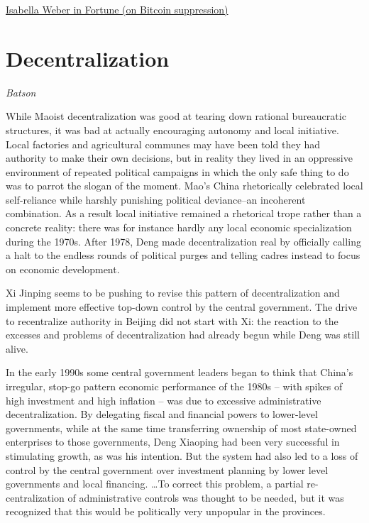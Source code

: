 \documentclass[
]{book}
\begin{document}
\href{https://fortune.com/2021/05/21/china-ban-bitcoin-price-bubble-crypto/}{Isabella Weber in Fortune (on Bitcoin suppression)}

\hypertarget{decentralization}{%
\section{Decentralization}\label{decentralization}}

\emph{Batson}

While Maoist decentralization was good at tearing down rational bureaucratic structures, it was bad at actually encouraging autonomy and local initiative. Local factories and agricultural communes may have been told they had authority to make their own decisions, but in reality they lived in an oppressive environment of repeated political campaigns in which the only safe thing to do was to parrot the slogan of the moment. Mao's China rhetorically celebrated local self-reliance while harshly punishing political deviance--an incoherent combination. As a result local initiative remained a rhetorical trope rather than a concrete reality: there was for instance hardly any local economic specialization during the 1970s. After 1978, Deng made decentralization real by officially calling a halt to the endless rounds of political purges and telling cadres instead to focus on economic development.

Xi Jinping seems to be pushing to revise this pattern of decentralization and implement more effective top-down control by the central government.
The drive to recentralize authority in Beijing did not start with Xi: the reaction to the excesses and problems of decentralization had already begun while Deng was still alive.

In the early 1990s some central government leaders began to think that China's irregular, stop-go pattern economic performance of the 1980s -- with spikes of high investment and high inflation -- was due to excessive administrative decentralization. By delegating fiscal and financial powers to lower-level governments, while at the same time transferring ownership of most state-owned enterprises to those governments, Deng Xiaoping had been very successful in stimulating growth, as was his intention. But the system had also led to a loss of control by the central government over investment planning by lower level governments and local financing. \ldots To correct this problem, a partial re-centralization of administrative controls was thought to be needed, but it was recognized that this would be politically very unpopular in the provinces.
\end{document}
